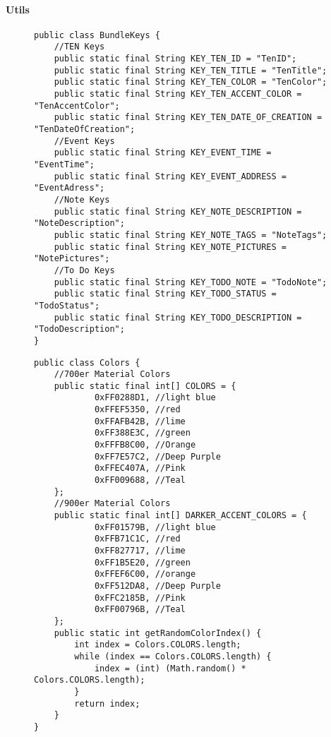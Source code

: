 		\paragraph{Utils}
\begin{figure}[H]
\begin{lstlisting}[caption=BundleKeys (Jan Beilfuß)]
public class BundleKeys {
    //TEN Keys
    public static final String KEY_TEN_ID = "TenID";
    public static final String KEY_TEN_TITLE = "TenTitle";
    public static final String KEY_TEN_COLOR = "TenColor";
    public static final String KEY_TEN_ACCENT_COLOR = "TenAccentColor";
    public static final String KEY_TEN_DATE_OF_CREATION = "TenDateOfCreation";
    //Event Keys
    public static final String KEY_EVENT_TIME = "EventTime";
    public static final String KEY_EVENT_ADDRESS = "EventAdress";
    //Note Keys
    public static final String KEY_NOTE_DESCRIPTION = "NoteDescription";
    public static final String KEY_NOTE_TAGS = "NoteTags";
    public static final String KEY_NOTE_PICTURES = "NotePictures";
    //To Do Keys
    public static final String KEY_TODO_NOTE = "TodoNote";
    public static final String KEY_TODO_STATUS = "TodoStatus";
    public static final String KEY_TODO_DESCRIPTION = "TodoDescription";
}
\end{lstlisting}
\end{figure}

\begin{figure}[H]
\begin{lstlisting}[caption=Colors (Jan Beilfuß)]
public class Colors {
    //700er Material Colors
    public static final int[] COLORS = {
            0xFF0288D1, //light blue
            0xFFEF5350, //red
            0xFFAFB42B, //lime
            0xFF388E3C, //green
            0xFFFB8C00, //Orange
            0xFF7E57C2, //Deep Purple
            0xFFEC407A, //Pink
            0xFF009688, //Teal
    };
    //900er Material Colors
    public static final int[] DARKER_ACCENT_COLORS = {
            0xFF01579B, //light blue
            0xFFB71C1C, //red
            0xFF827717, //lime
            0xFF1B5E20, //green
            0xFFEF6C00, //orange
            0xFF512DA8, //Deep Purple
            0xFFC2185B, //Pink
            0xFF00796B, //Teal
    };
    public static int getRandomColorIndex() {
        int index = Colors.COLORS.length;
        while (index == Colors.COLORS.length) {
            index = (int) (Math.random() * Colors.COLORS.length);
        }
        return index;
    }
}
\end{lstlisting}
\end{figure}

